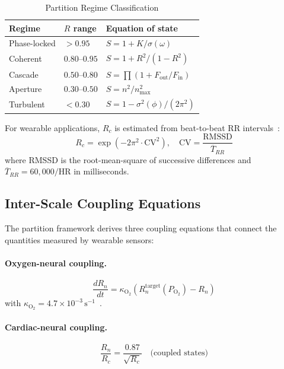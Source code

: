 \documentclass[10pt,twocolumn,a4paper]{article}
\theoremstyle{definition}
\newcommand{\Rc}{R_c}
\newcommand{\Rn}{R_n}
\begin{document}
\begin{table}[H]
\centering
\caption{Partition Regime Classification}
\label{tab:regimes}
\begin{tabular}{lll}
\toprule
\textbf{Regime} & \textbf{$R$ range} & \textbf{Equation of state}\\
\midrule
Phase-locked & $>0.95$ & $S = 1 + K/\sigma(\omega)$\\
Coherent     & $0.80$--$0.95$ & $S = 1 + R^2/(1-R^2)$\\
Cascade      & $0.50$--$0.80$ & $S = \prod(1 + F_{\text{out}}/F_{\text{in}})$\\
Aperture     & $0.30$--$0.50$ & $S = n^2/n^2_{\max}$\\
Turbulent    & $<0.30$ & $S = 1 - \sigma^2(\phi)/(2\pi^2)$\\
\bottomrule
\end{tabular}
\end{table}

For wearable applications, $\Rc$ is estimated from beat-to-beat RR
intervals~\cite{malik1996heart,shaffer2017overview}:
\begin{equation}
\label{eq:rc_estimator}
\Rc = \exp\!\left(-2\pi^2 \cdot \text{CV}^2\right),
\quad \text{CV} = \frac{\text{RMSSD}}{\overline{T}_{RR}}
\end{equation}
where RMSSD is the root-mean-square of successive differences and
$\overline{T}_{RR} = 60{,}000/\text{HR}$ in milliseconds.

\subsection{Inter-Scale Coupling Equations}

The partition framework derives three coupling equations that connect
the quantities measured by wearable sensors:

\paragraph{Oxygen-neural coupling.}
\begin{equation}
\label{eq:kappa}
\frac{d\Rn}{dt} = \kappa_{\text{O}_2} \left(\Rn^{\text{target}}(P_{\text{O}_2}) - \Rn\right)
\end{equation}
with $\kappa_{\text{O}_2} = 4.7 \times 10^{-3}\,\text{s}^{-1}$~\cite{sachikonye2024integration}.

\paragraph{Cardiac-neural coupling.}
\begin{equation}
\label{eq:cn_coupling}
\frac{\Rn}{\Rc} = \frac{0.87}{\sqrt{\Rc}}
\quad \text{(coupled states)}
\end{equation}
\end{document}
